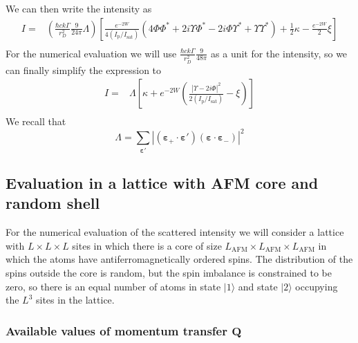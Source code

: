 \documentclass[11pt,letter]{article}
\newcommand{\bv}[1]{\ensuremath{\bm{#1}}}
\begin{document}
We can then write the intensity as 
\begin{equation}
\begin{split}
 I  = &
 \left( 
 \frac{\hbar c k \Gamma}{r_{D}^{2}}  
     \frac{9}{24\pi} \Lambda 
  \right)
  \left[
  \frac{ e^{-2W} }{ 4 (I_{\mathrm{p}}/I_{\mathrm{sat}})}
  \left( 
    4 \Phi \Phi^{*}
    + 2i \Upsilon \Phi^{*} 
    - 2i \Phi \Upsilon^{*}
    + \Upsilon \Upsilon^{*}  
          \right)
  + \frac{1}{2}\kappa - \frac{ e^{-2W}}{2} \xi
\right] \\ 
\end{split}
\end{equation}
For the numerical evaluation we will use $\frac{\hbar c k \Gamma}{r_{D}^{2}}  
     \frac{9}{48\pi}$  as a unit for the intensity, so we can finally simplify the expression to
\begin{equation}
\begin{split}
  I  = &
 \Lambda 
  \left[
  \kappa + 
  e^{-2W} \left(  
  \frac{ | \Upsilon - 2 i \Phi |^{2} }{  2 (I_{\mathrm{p}}/I_{\mathrm{sat}})}
   - \xi \right)
  \right] \\ 
\end{split}
\end{equation}
We recall that 
\begin{equation}
 \Lambda = 
  \sum_{\bv{\varepsilon}' }
        | (\bv{\varepsilon}_{+}\cdot \bv{\varepsilon}' )
                        (\bv{\varepsilon}\cdot \bv{\varepsilon}_{-} ) |^{2} 
\end{equation} 

\subsection{Evaluation in a lattice with AFM core and random shell}

For the numerical evaluation of the scattered intensity we will consider a
lattice with $L\times L\times L$ sites in which there is a core of size
$L_{\mathrm{AFM}} \times L_{\mathrm{AFM}} \times L_{\mathrm{AFM}}$ in which the
atoms have antiferromagnetically ordered spins.   The distribution of the spins
outside the core is random, but the spin imbalance is constrained to be zero,
so there is an equal number of atoms in state $|1\rangle$ and state
$|2\rangle $  occupying the $L^{3}$ sites in the lattice.

\subsubsection{Available values of momentum transfer $\bv{Q}$}
\end{document}
